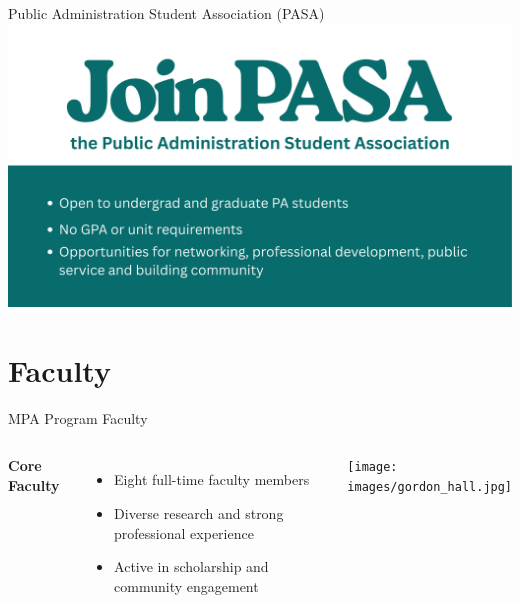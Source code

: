 \documentclass[10pt]{beamer}
\begin{document}
\begin{frame}{Public Administration Student Association (PASA)}
  \centering
  \includegraphics[width=\textwidth]{images/join_PASA.png}
\end{frame}

\section{\textcolor{titanorange}{Faculty}}
\begin{frame}{MPA Program Faculty}
\begin{columns}[T,onlytextwidth]
  \textbf{Core Faculty}
  \begin{itemize}
    \item Eight full-time faculty members
    \item Diverse research and strong professional experience
    \item Active in scholarship and community engagement
  \end{itemize}
  \texttt{[image: images/gordon\_hall.jpg]}
\end{columns}
\end{frame}
\end{document}
